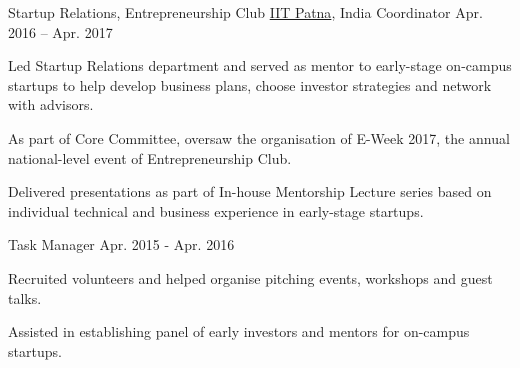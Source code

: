 \begin{cvpositions}
\cvroletwo
	{Startup Relations, Entrepreneurship Club} %
	{\href{https://www.iitp.ac.in}{IIT Patna}, India\acvHeaderIconSep{}} %
	{Coordinator} %
	{Apr. 2016 -- Apr. 2017} %
	{\begin{cvitems} %
		\item {Led Startup Relations department and served as mentor to early-stage on-campus startups to help develop business plans, choose investor strategies and network with advisors.}
		\item {As part of Core Committee, oversaw the organisation of E-Week 2017, the annual national-level event of Entrepreneurship Club.}
		\item {Delivered presentations as part of In-house Mentorship Lecture series based on individual technical and business experience in early-stage startups.}
	\end{cvitems}}
	{Task Manager} %
	{Apr. 2015 - Apr. 2016} %
	{\begin{cvitems} %
		\item {Recruited volunteers and helped organise pitching events, workshops and guest talks.}
		\item {Assisted in establishing panel of early investors and mentors for on-campus startups.}
	\end{cvitems}}

\end{cvpositions}

